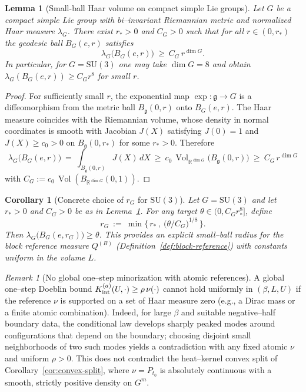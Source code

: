 \documentclass[11pt]{amsart}
\theoremstyle{plain}
\newtheorem{lemma}[theorem]{Lemma}
\newtheorem{corollary}[theorem]{Corollary}
\theoremstyle{definition}
\theoremstyle{remark}
\newtheorem{remark}[theorem]{Remark}
\begin{document}
\begin{lemma}[Small-ball Haar volume on compact simple Lie groups]\label{lem:small-ball-volume}
Let $G$ be a compact simple Lie group with bi--invariant Riemannian metric and normalized Haar measure $\lambda_G$. There exist $r_*>0$ and $C_G>0$ such that for all $r\in(0,r_*)$ the geodesic ball $B_G(e,r)$ satisfies
\[
  \lambda_G\big(B_G(e,r)\big)\ \ge\ C_G\, r^{\dim G}.
\]
In particular, for $G=\mathrm{SU}(3)$ one may take $\dim G=8$ and obtain $\lambda_G(B_G(e,r))\ge C_G r^{8}$ for small $r$.
\end{lemma}
\begin{proof}
For sufficiently small $r$, the exponential map $\exp: \mathfrak g\to G$ is a diffeomorphism from the metric ball $B_{\mathfrak g}(0,r)$ onto $B_G(e,r)$. The Haar measure coincides with the Riemannian volume, whose density in normal coordinates is smooth with Jacobian $J(X)$ satisfying $J(0)=1$ and $J(X)\ge c_0>0$ on $B_{\mathfrak g}(0,r_*)$ for some $r_*>0$. Therefore
\[
  \lambda_G\big(B_G(e,r)\big)
   \ =\ \int_{B_{\mathfrak g}(0,r)} J(X)\,dX
   \ \ge\ c_0\, \operatorname{Vol}_{\mathbb R^{\dim G}}\big(B_{\mathfrak g}(0,r)\big)
   \ \ge\ C_G\, r^{\dim G}
\]
with $C_G:=c_0\, \operatorname{Vol}(B_{\mathbb R^{\dim G}}(0,1))$.
\end{proof}

\begin{corollary}[Concrete choice of $r_G$ for $\mathrm{SU}(3)$]\label{cor:explicit-rG-SU3}
Let $G=\mathrm{SU}(3)$ and let $r_*>0$ and $C_G>0$ be as in Lemma~\ref{lem:small-ball-volume}. For any target $\theta\in(0, C_G r_*^{8}]$, define
\[
  r_G\ :=\ \min\Big\{\,r_*\,,\ \big(\theta/C_G\big)^{1/8}\,\Big\}.
\]
Then $\lambda_G\big(B_G(e,r_G)\big)\ge \theta$. This provides an explicit small--ball radius for the block reference measure $Q^{(B)}$ (Definition~\ref{def:block-reference}) with constants uniform in the volume $L$.
\end{corollary}

\begin{remark}[No global one--step minorization with atomic references]\label{rem:no-global-minorization-atomic}
A global one--step Doeblin bound $K_{\rm int}^{(a)}(U,\cdot)\ge \rho\,\nu(\cdot)$ cannot hold uniformly in $(\beta,L,U)$ if the reference $\nu$ is supported on a set of Haar measure zero (e.g., a Dirac mass or a finite atomic combination). Indeed, for large $\beta$ and suitable negative--half boundary data, the conditional law develops sharply peaked modes around configurations that depend on the boundary; choosing disjoint small neighborhoods of two such modes yields a contradiction with any fixed atomic $\nu$ and uniform $\rho>0$. This does not contradict the heat--kernel convex split of Corollary~\ref{cor:convex-split}, where $\nu=P_{t_0}$ is absolutely continuous with a smooth, strictly positive density on $G^m$.
\end{remark}
\end{document}
